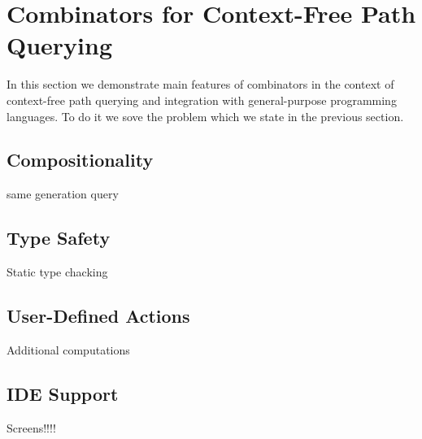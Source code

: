 \section{Combinators for Context-Free Path Querying}

In this section we demonstrate main features of combinators in the context of context-free path querying and integration with general-purpose programming languages.
To do it we sove the problem which we state in the previous section.


\subsection{Compositionality}

same generation query

\subsection{Type Safety}

Static type chacking

\subsection{User-Defined Actions}

Additional computations

\subsection{IDE Support}

Screens!!!!
